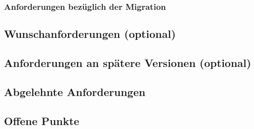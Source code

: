 \documentclass[12pt]{article}
\begin{document}
\subsubsection{Anforderungen bezüglich der Migration}

\subsection{Wunschanforderungen (optional)}

\subsection{Anforderungen an spätere Versionen (optional)}

\subsection{Abgelehnte Anforderungen}

\subsection{Offene Punkte}
\end{document}
